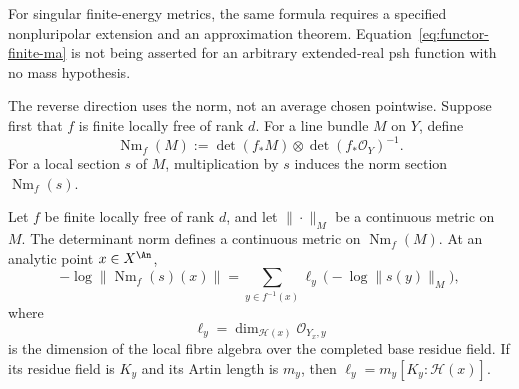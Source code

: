 \begin{remark}
\label{rem:functor-finite-singular}
For singular finite-energy metrics, the same formula requires a
specified nonpluripolar extension and an approximation theorem.
Equation~\eqref{eq:functor-finite-ma} is not being asserted for an
arbitrary extended-real psh function with no mass hypothesis.
\end{remark}

The reverse direction uses the norm, not an average chosen pointwise.
Suppose first that $f$ is finite locally free of rank $d$. For a
line bundle $M$ on $Y$, define
\[
 \operatorname{Nm}_f(M)
   :=\det(f_*M)\otimes\det(f_*\mathcal O_Y)^{-1}.
\tag{67.10}\label{eq:functor-norm-line}
\]
For a local section $s$ of $M$, multiplication by $s$ induces
the norm section $\operatorname{Nm}_f(s)$.

\begin{proposition}\label{prop:functor-determinant-norm}
Let $f$ be finite locally free of rank $d$, and let
$\|\cdot\|_M$ be a continuous metric on $M$. The determinant norm
defines a continuous metric on $\operatorname{Nm}_f(M)$. At an
analytic point $x\in X^{\An}$,
\[
 -\log\|\operatorname{Nm}_f(s)(x)\|
   =
 \sum_{y\in f^{-1}(x)}
       \ell_y\,\bigl(-\log\|s(y)\|_M\bigr),
\tag{67.11}\label{eq:functor-norm-weight}
\]
where
\[
   \ell_y=\dim_{\mathcal H(x)}
          \mathcal O_{Y_x,y}
\tag{67.12}\label{eq:functor-fibre-length}
\]
is the dimension of the local fibre algebra over the completed base
residue field. If its residue field is $K_y$ and its Artin length is $m_y$,
then $\ell_y=m_y[K_y:\mathcal H(x)]$.
\end{proposition}

